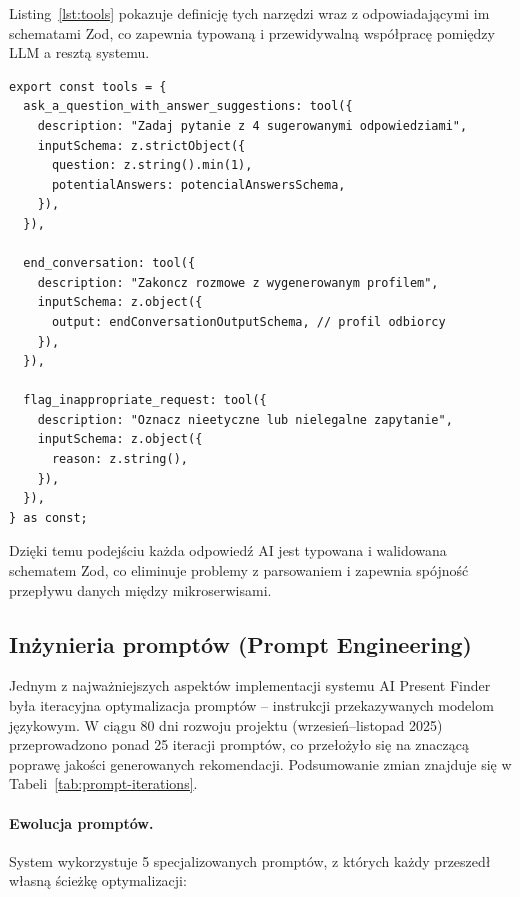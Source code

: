 \documentclass[12pt,a4paper]{article}
\begin{document}
Listing~\ref{lst:tools} pokazuje definicję tych narzędzi wraz z odpowiadającymi im schematami Zod, co zapewnia typowaną i przewidywalną współpracę pomiędzy LLM a resztą systemu.

\begin{lstlisting}[caption={Definicja narzędzi AI dla strukturyzacji wywiadu},label={lst:tools}]
export const tools = {
  ask_a_question_with_answer_suggestions: tool({
    description: "Zadaj pytanie z 4 sugerowanymi odpowiedziami",
    inputSchema: z.strictObject({
      question: z.string().min(1),
      potentialAnswers: potencialAnswersSchema,
    }),
  }),
  
  end_conversation: tool({
    description: "Zakoncz rozmowe z wygenerowanym profilem",
    inputSchema: z.object({
      output: endConversationOutputSchema, // profil odbiorcy
    }),
  }),
  
  flag_inappropriate_request: tool({
    description: "Oznacz nieetyczne lub nielegalne zapytanie",
    inputSchema: z.object({
      reason: z.string(),
    }),
  }),
} as const;
\end{lstlisting}

Dzięki temu podejściu każda odpowiedź AI jest typowana i walidowana schematem Zod, co eliminuje problemy z parsowaniem i zapewnia spójność przepływu danych między mikroserwisami.

\subsection{Inżynieria promptów (Prompt Engineering)}

Jednym z najważniejszych aspektów implementacji systemu AI Present Finder była iteracyjna optymalizacja promptów -- instrukcji przekazywanych modelom językowym. W ciągu 80 dni rozwoju projektu (wrzesień--listopad 2025) przeprowadzono ponad 25 iteracji promptów, co przełożyło się na znaczącą poprawę jakości generowanych rekomendacji. Podsumowanie zmian znajduje się w Tabeli~\ref{tab:prompt-iterations}.

\paragraph{Ewolucja promptów.}
System wykorzystuje 5 specjalizowanych promptów, z których każdy przeszedł własną ścieżkę optymalizacji:
\end{document}
